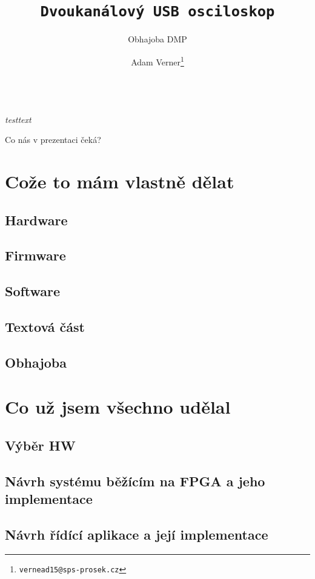 \documentclass{beamer}
\title{\texttt{\LARGE Dvoukanálový USB osciloskop}}
\subtitle{ Obhajoba DMP }
\author{ Adam Verner\footnote{\texttt{vernead15@sps-prosek.cz}}}
\begin{document}
\begin{frame}
  \maketitle \\
  \textit{testtext}
\end{frame}

\begin{frame}{Co nás v prezentaci čeká?}
  \tableofcontents
\end{frame}

\section{Cože to mám vlastně dělat}


\subsection{Hardware}
\subsection{Firmware}
\subsection{Software}
\subsection{Textová část}
\subsection{Obhajoba}  %


\section{Co už jsem všechno udělal}
\subsection{Výběr HW}
\subsection{Návrh systému běžícím na FPGA a jeho implementace}
\subsection{Návrh řídící aplikace a její implementace}
\end{document}

